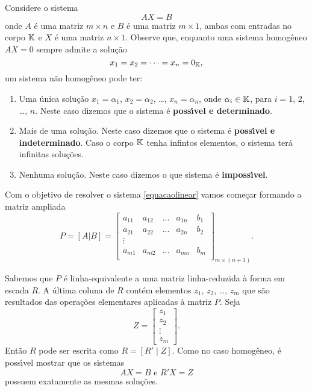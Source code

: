 Considere o sistema
\begin{equation}\label{equacaolinear}
AX = B
\end{equation}
onde $A$ \'e uma matriz $m \times n$ e $B$ \'e uma matriz $m \times 1$, ambas com entradas no corpo $\mathbb{K}$ e $X$ \'e uma matriz $n \times 1$. Observe que, enquanto uma sistema homog\^eneo $AX = 0$ sempre admite a solu\c{c}\~ao
\[
x_1 = x_2 = \cdots = x_n = 0_{\mathbb{K}},
\]
um sistema n\~ao homog\^eneo pode ter:
\begin{enumerate}
	\item Uma \'unica solu\c{c}\~ao $x_1 = \alpha_1$, $x_2 = \alpha_2$, \dots, $x_n = \alpha_n$, onde $\alpha_i \in \mathbb{K}$, para $i = 1$, 2, \dots, $n$. Neste caso dizemos que o sistema \'e \textbf{poss{\'\i}vel e determinado}.
	\item Mais de uma solu\c{c}\~ao. Neste caso dizemos que o sistema \'e \textbf{poss{\'\i}vel e indeterminado}. Caso o corpo $\mathbb{K}$ tenha infintos elementos, o sistema ter\'a infinitas solu\c{c}\~oes.
	\item Nenhuma solu\c{c}\~ao. Neste caso dizemos o que sistema \'e \textbf{imposs{\'\i}vel}.
\end{enumerate}

Com o objetivo de resolver o sistema \eqref{equacaolinear} vamos come\c{c}ar formando a matriz ampliada
\[
P = [A|B] = \begin{bmatrix}
a_{11} & a_{12} & \dots & a_{1n} & b_1\\
a_{21} & a_{22} & \dots & a_{2n} & b_2\\
\vdots\\
a_{m1} & a_{m2} & \dots & a_{mn} & b_m\\
\end{bmatrix}_{m \times (n + 1)}.
\]

Sabemos que $P$ \'e linha-equivalente a uma matriz linha-reduzida \`a forma em escada $R$. A \'ultima coluna de $R$ cont\'em elementos $z_1$, $z_2$, \dots, $z_m$ que s\~ao resultados das opera\c{c}\~oes elementares aplicadas \`a matriz $P$. Seja 
\[
Z = \begin{bmatrix}
z_1\\
z_2\\
\vdots\\
z_m
\end{bmatrix}.
\]
Ent\~ao $R$ pode ser escrita como $R = [R' \mid Z]$. Como no caso homog\^eneo, \'e poss{\'\i}vel mostrar que os sistemas
\[
AX = B \mbox{ e } R'X = Z
\]
possuem exatamente as mesmas solu\c{c}\~oes.

